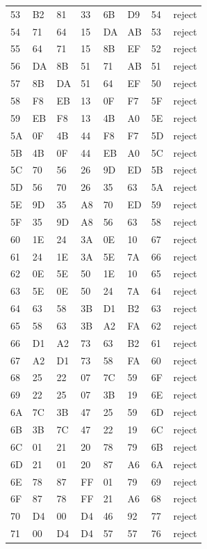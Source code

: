 \begin{longtable}{llllllll}
53 & B2 & 81 & 33 & 6B & D9 & 54 & reject\\
54 & 71 & 64 & 15 & DA & AB & 53 & reject\\
55 & 64 & 71 & 15 & 8B & EF & 52 & reject\\
56 & DA & 8B & 51 & 71 & AB & 51 & reject\\
57 & 8B & DA & 51 & 64 & EF & 50 & reject\\
58 & F8 & EB & 13 & 0F & F7 & 5F & reject\\
59 & EB & F8 & 13 & 4B & A0 & 5E & reject\\
5A & 0F & 4B & 44 & F8 & F7 & 5D & reject\\
5B & 4B & 0F & 44 & EB & A0 & 5C & reject\\
5C & 70 & 56 & 26 & 9D & ED & 5B & reject\\
5D & 56 & 70 & 26 & 35 & 63 & 5A & reject\\
5E & 9D & 35 & A8 & 70 & ED & 59 & reject\\
5F & 35 & 9D & A8 & 56 & 63 & 58 & reject\\
60 & 1E & 24 & 3A & 0E & 10 & 67 & reject\\
61 & 24 & 1E & 3A & 5E & 7A & 66 & reject\\
62 & 0E & 5E & 50 & 1E & 10 & 65 & reject\\
63 & 5E & 0E & 50 & 24 & 7A & 64 & reject\\
64 & 63 & 58 & 3B & D1 & B2 & 63 & reject\\
65 & 58 & 63 & 3B & A2 & FA & 62 & reject\\
66 & D1 & A2 & 73 & 63 & B2 & 61 & reject\\
67 & A2 & D1 & 73 & 58 & FA & 60 & reject\\
68 & 25 & 22 & 07 & 7C & 59 & 6F & reject\\
69 & 22 & 25 & 07 & 3B & 19 & 6E & reject\\
6A & 7C & 3B & 47 & 25 & 59 & 6D & reject\\
6B & 3B & 7C & 47 & 22 & 19 & 6C & reject\\
6C & 01 & 21 & 20 & 78 & 79 & 6B & reject\\
6D & 21 & 01 & 20 & 87 & A6 & 6A & reject\\
6E & 78 & 87 & FF & 01 & 79 & 69 & reject\\
6F & 87 & 78 & FF & 21 & A6 & 68 & reject\\
70 & D4 & 00 & D4 & 46 & 92 & 77 & reject\\
71 & 00 & D4 & D4 & 57 & 57 & 76 & reject\\

\end{longtable}
